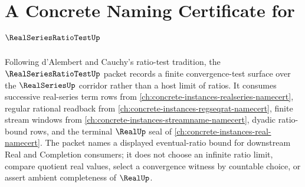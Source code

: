 \chapter{A Concrete Naming Certificate for $\RealSeriesRatioTestUp$}
\label{ch:concrete-instances-real-series-ratio-test-namecert}

Following d'Alembert and Cauchy's ratio-test tradition, the $\RealSeriesRatioTestUp$ packet records a finite convergence-test surface over the $\RealSeriesUp$ corridor rather than a host limit of ratios. It consumes successive real-series term rows from \autoref{ch:concrete-instances-realseries-namecert}, regular rational readback from \autoref{ch:concrete-instances-regseqrat-namecert}, finite stream windows from \autoref{ch:concrete-instances-streamname-namecert}, dyadic ratio-bound rows, and the terminal $\RealUp$ seal of \autoref{ch:concrete-instances-real-namecert}. The packet names a displayed eventual-ratio bound for downstream Real and Completion consumers; it does not choose an infinite ratio limit, compare quotient real values, select a convergence witness by countable choice, or assert ambient completeness of $\RealUp$.

